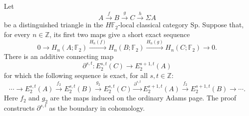 \begin{theorem}
\label{sem:Literature:spectrum-homology-short-exact-e2}
Let
\[
  A\xrightarrow{f}B\xrightarrow{g}C\xrightarrow{h}\Sigma A
\]
be a distinguished triangle in the $H\mathbb F_2$-local classical
category $\mathrm{Sp}$. Suppose that, for every
$n\in\mathbb Z$, its first two maps give a short exact sequence
\[
  0\longrightarrow H_n(A;\mathbb F_2)
  \xrightarrow{H_n(f)}H_n(B;\mathbb F_2)
  \xrightarrow{H_n(g)}H_n(C;\mathbb F_2)\longrightarrow0.
\]
There is an additive connecting map
\[
  \partial^{s,t}:E_2^{s,t}(C)\longrightarrow E_2^{s+1,t}(A)
\]
for which the following sequence is exact, for all $s,t\in\mathbb Z$:
\[
  \cdots\longrightarrow E_2^{s,t}(A)
  \xrightarrow{f_2}E_2^{s,t}(B)
  \xrightarrow{g_2}E_2^{s,t}(C)
  \xrightarrow{\partial^{s,t}}E_2^{s+1,t}(A)
  \xrightarrow{f_2}E_2^{s+1,t}(B)\longrightarrow\cdots .
\]
Here $f_2$ and $g_2$ are the maps induced on the ordinary Adams page.
The proof constructs $\partial^{s,t}$ as the boundary in cohomology.

\end{theorem}
